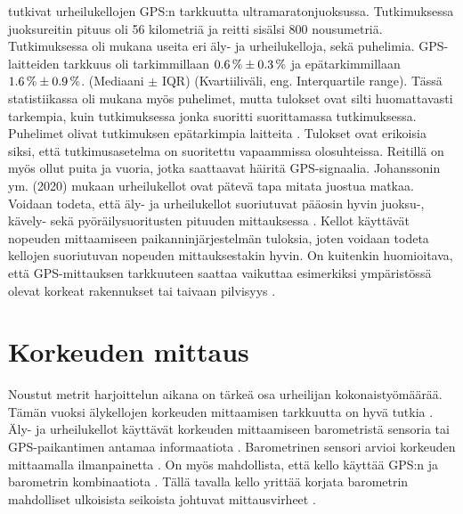 \documentclass[utf8,bachelor,finnish]{bachelor}
\begin{document}
  \textcite{johansson_accuracy_2020} tutkivat urheilukellojen GPS:n tarkkuutta ultramaratonjuoksussa. Tutkimuksessa juoksureitin pituus oli 56 kilometriä ja reitti sisälsi 800 nousumetriä.
   Tutkimuksessa oli mukana useita eri äly- ja urheilukelloja, sekä puhelimia.
    GPS-laitteiden tarkkuus oli tarkimmillaan $\SI{0.6 \pm 0.3}{\percent}$ ja epätarkimmillaan $ \SI{1.6 \pm 0.9}{\percent} $. (Mediaani $\pm$ IQR) (Kvartiiliväli, eng. Interquartile range).
     Tässä statistiikassa oli mukana myös puhelimet, mutta 
     tulokset ovat silti huomattavasti tarkempia, kuin tutkimuksessa jonka suoritti \textcite{gilgen-ammann_accuracy_2020} suorittamassa tutkimuksessa. Puhelimet olivat tutkimuksen epätarkimpia laitteita \parencite{johansson_accuracy_2020}.
      Tulokset ovat erikoisia siksi, että \textcite{johansson_accuracy_2020} tutkimusasetelma on suoritettu vapaammissa olosuhteissa. Reitillä on myös ollut puita ja vuoria, jotka saattaavat häiritä GPS-signaalia.
       Johanssonin ym. (2020) mukaan urheilukellot ovat pätevä tapa mitata juostua matkaa.\\

  Voidaan todeta, että äly- ja urheilukellot suoriutuvat pääosin hyvin juoksu-, kävely- sekä pyöräilysuoritusten pituuden mittauksessa \parencite{gilgen-ammann_accuracy_2020,johansson_accuracy_2020}.
   Kellot käyttävät nopeuden mittaamiseen paikanninjärjestelmän tuloksia, joten voidaan todeta kellojen suoriutuvan nopeuden mittauksestakin hyvin. On kuitenkin huomioitava,
    että GPS-mittauksen tarkkuuteen saattaa vaikuttaa esimerkiksi ympäristössä olevat korkeat rakennukset tai taivaan pilvisyys \parencite{baranski_enhancing_2012}.

  \section{Korkeuden mittaus}
    Noustut metrit harjoittelun aikana on tärkeä osa urheilijan kokonaistyömäärää. Tämän vuoksi älykellojen korkeuden mittaamisen tarkkuutta on hyvä tutkia \parencite{ammann_accuracy_2016}.
     Äly- ja urheilukellot käyttävät korkeuden mittaamiseen barometristä sensoria tai GPS-paikantimen antamaa informaatiota \parencite{ammann_accuracy_2016}.
      Barometrinen sensori arvioi korkeuden mittaamalla ilmanpainetta \parencite{aroganam2019review}.
       On myös mahdollista, että kello käyttää GPS:n ja barometrin kombinaatiota \parencite{aroganam2019review}. Tällä tavalla kello yrittää korjata barometrin mahdolliset ulkoisista seikoista
        johtuvat mittausvirheet \parencite{aroganam2019review}.\\
        
\end{document}
